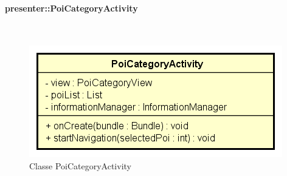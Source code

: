 \documentclass[../DefinizioneDiProdotto.tex]{subfiles}
\begin{document}
\paragraph{presenter::PoiCategoryActivity}
\
\begin{figure}[H]
	\centering
	\includegraphics[width=\maxwidth]{img/PoiCategoryActivity.png}
	\caption{Classe PoiCategoryActivity}\label{fig:presenter::PoiCategoryActivity} 
\end{figure}
\end{document}
